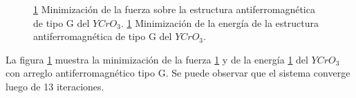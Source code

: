 \begin{figure}[H]
    \centering
    \singlespace
    \caption[Minimizaci\'on de la fuerza y la energ\'ia del $YCrO_{3}$ con 
    arreglo antiferromagn\'etico tipo 
    G]{\ref{minimizacion_yco_G}  Minimizaci\'on de la 
        fuerza sobre la estructura antiferromagn\'etica de tipo G del 
        $YCrO_{3}$. 
        \ref{minimizacion_yco_G}  Minimizaci\'on de la 
        energ\'ia de la estructura antiferromagn\'etica de tipo G del 
        $YCrO_{3}$.}
    \label{minimizacion_yco_G}
\end{figure}

\noindent La figura \ref{minimizacion_yco_G} muestra la minimizaci\'on de la 
fuerza \ref{minimizacion_yco_G}  y de la energ\'ia 
\ref{minimizacion_yco_G}  del $YCrO_{3}$ con arreglo 
antiferromagn\'etico tipo G. Se puede observar que el sistema converge luego de 
13 iteraciones.
